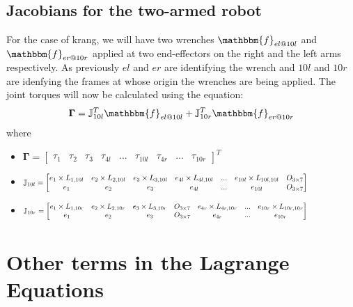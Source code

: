 \documentclass[a4paper,10pt]{article}
\newcommand\scalemath[2]{\scalebox{#1}{\mbox{\ensuremath{\displaystyle #2}}}}
\begin{document}
\subsection{Jacobians for the two-armed robot}
For the case of krang, we will have two wrenches $\mathbbm{f}_{el@10l}$ and $\mathbbm{f}_{er@10r}$ applied at 
two end-effectors on the right and the left arms respectively. As previously $el$ and $er$ are identifying the
wrench and $10l$ and $10r$ are idenfying the frames at whose origin the wrenches are being applied. The joint
torques will now be calculated using the equation:
\begin{align}
 \mathbf{\Gamma} = \mathbb{J}_{10l}^T\mathbbm{f}_{el@10l} + \mathbb{J}_{10r}^T\mathbbm{f}_{er@10r}
\end{align} where
\begin{itemize}
 \item $\mathbf{\Gamma} = \left[ \begin{matrix} \tau_1 & \tau_2 & \tau_3 & \tau_{4l} & ... & \tau_{10l} & \tau_{4r} & ... & \tau_{10r} \end{matrix} \right]^T$
 \item $\scalemath{0.775}{\mathbb{J}_{10l} = \left[ \begin{matrix} e_1\times L_{1,10l} & e_2\times L_{2,10l} 
 & e_3\times L_{3,10l} & e_{4l}\times L_{4l,10l} & ... & e_{10l}\times L_{10l,10l} & O_{3\times 7} \\ 
 e_1 & e_2 & e_3 & e_{4l} & ... & e_{10l} & O_{3\times 7} \end{matrix} \right]}$
 \item $\scalemath{0.75}{\mathbb{J}_{10r} = \left[ \begin{matrix} e_1\times L_{1,10r} & e_2\times L_{2,10r} 
 & e_3\times L_{3,10r} & O_{3\times 7} & e_{4r}\times L_{4r,10r} & ... & e_{10r}\times L_{10r,10r} \\ 
 e_1 & e_2 & e_3 & O_{3\times 7} & e_{4r} & ... & e_{10r}  \end{matrix} \right]}$
\end{itemize}


\section{Other terms in the Lagrange Equations}
\end{document}
